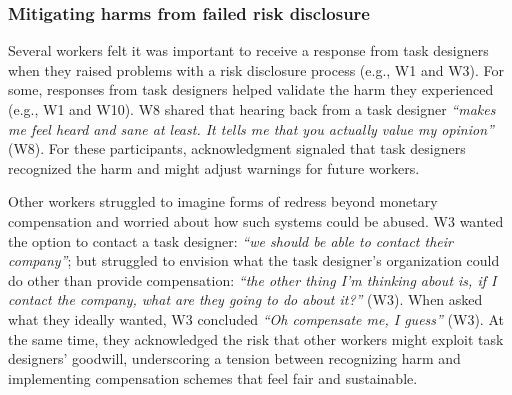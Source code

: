 \subsubsection{Mitigating harms from failed risk disclosure}
Several workers felt it was important to receive a response from task designers when they raised problems with a risk disclosure process (e.g., W1 and W3). For some, responses from task designers helped validate the harm they experienced (e.g., W1 and W10). W8 shared that hearing back from a task designer  \textit{``makes me feel heard and sane at least. It tells me that you actually value my opinion''} (W8). 
For these participants, acknowledgment signaled that task designers recognized the harm and might adjust warnings for future workers.

Other workers struggled to imagine forms of redress beyond monetary compensation and worried about how such systems could be abused. W3 wanted the option to contact a task designer: \textit{``we should be able to contact their company''}; but struggled to envision what the task designer's organization could do other than provide compensation: \textit{``the other thing I'm thinking about is, if I contact the company, what are they going to do about it?''} (W3). When asked what they ideally wanted, W3 concluded \textit{``Oh compensate me, I guess''} (W3). At the same time, they acknowledged the risk that other workers might exploit task designers’ goodwill, underscoring a tension between recognizing harm and implementing compensation schemes that feel fair and sustainable.

